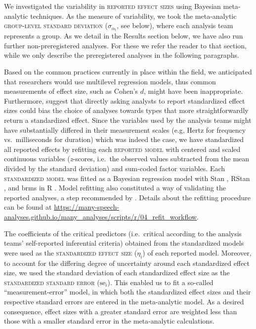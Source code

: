\documentclass[Review,times,sageh]{sagej}
\begin{document}
We investigated the variability in \textsc{reported effect sizes} using Bayesian meta-analytic techniques.
As the measure of variability, we took the meta-analytic \textsc{group-level standard deviation} (\(\sigma_{\alpha_{\text{t}}}\), see below), where each analysis team represents a group.
As we detail in the Results section below, we have also run further non-preregistered analyses.
For these we refer the reader to that section, while we only describe the preregistered analyses in the following paragraphs.

Based on the common practices currently in place within the field, we anticipated that researchers would use multilevel regression models, thus common measurements of effect size, such as Cohen's \(d\), might have been inappropriate.
Furthermore, \citet{aczel2021} suggest that directly asking analysts to report standardized effect sizes could bias the choice of analyses towards types that more straightforwardly return a standardized effect.
Since the variables used by the analysis teams might have substantially differed in their measurement scales (e.g, Hertz for frequency vs.~milliseconds for duration) which was indeed the case, we have standardized all reported effects by refitting each \textsc{reported model} with centered and scaled continuous variables (\emph{z}-scores, i.e.~the observed values subtracted from the mean divided by the standard deviation) and sum-coded factor variables.
Each \textsc{standardized model} was fitted as a Bayesian regression model with Stan \citep{stan2021}, RStan \citep{stan2020a}, and brms \citep{burkner2017} in R \citep{R-base}.
Model refitting also constituted a way of validating the reported analyses, a step recommended by \citet{aczel2021}.
Details about the refitting procedure can be found at \url{https://many-speech-analyses.github.io/many_analyses/scripts/r/04_refit_workflow}.

The coefficients of the critical predictors (i.e.~critical according to the analysis teams' self-reported inferential criteria) obtained from the standardized models were used as the \textsc{standardized effect size} (\(\eta_i\)) of each reported model.
Moreover, to account for the differing degree of uncertainty around each standardized effect size, we used the standard deviation of each standardized effect size as the \textsc{standardized standard error} (\(\text{se}_i\)).
This enabled us to fit a so-called ``measurement-error'' model, in which both the standardized effect sizes and their respective standard errors are entered in the meta-analytic model.
As a desired consequence, effect sizes with a greater standard error are weighted less than those with a smaller standard error in the meta-analytic calculations.
\end{document}
